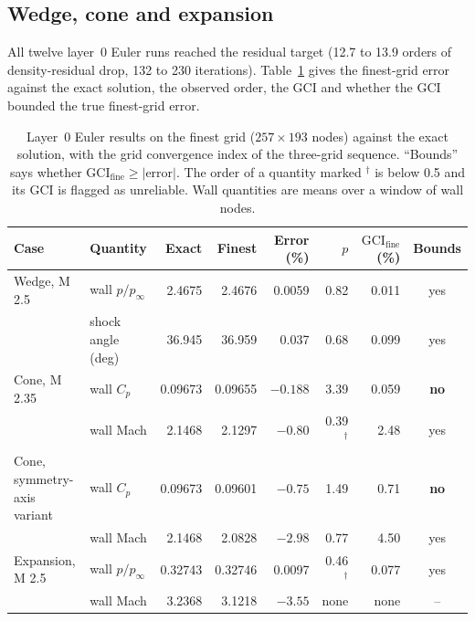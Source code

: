 \documentclass[11pt,a4paper]{article}
\newcommand{\Cp}{C_p}
\newcommand{\pinf}{p_\infty}
\newcommand{\fine}{\mathrm{fine}}
\newcommand{\tick}{yes}
\newcommand{\cross}{\textbf{no}}
\begin{document}
\subsection{Wedge, cone and expansion}
\label{sec:l0results}

All twelve layer~0 Euler runs reached the residual target (12.7 to 13.9 orders of density-residual drop, 132 to
230 iterations).
Table~\ref{tab:l0} gives the finest-grid error against the exact solution, the observed order, the GCI and
whether the GCI bounded the true finest-grid error.

\begin{table}[t]
\centering
\caption{Layer~0 Euler results on the finest grid ($257\times193$ nodes) against the exact solution, with the grid convergence index of the three-grid sequence.
``Bounds'' says whether $\mathrm{GCI}_\fine\ge|\text{error}|$.
The order of a quantity marked $^\dagger$ is below 0.5 and its GCI is flagged as unreliable. Wall quantities are means over a window of wall nodes.}
\label{tab:l0}
\footnotesize
\setlength{\tabcolsep}{4pt}
\begin{tabular}{@{}llrrrrrc@{}}
\toprule
Case & Quantity & Exact & Finest & Error (\%) & $p$ & $\mathrm{GCI}_\fine$ (\%) & Bounds \\
\midrule
Wedge, M 2.5 & wall $p/\pinf$ & 2.4675 & 2.4676 & 0.0059 & 0.82 & 0.011 & \tick \\
 & shock angle (deg) & 36.945 & 36.959 & 0.037 & 0.68 & 0.099 & \tick \\
Cone, M 2.35 & wall $\Cp$ & 0.09673 & 0.09655 & $-0.188$ & 3.39 & 0.059 & \cross \\
 & wall Mach & 2.1468 & 2.1297 & $-0.80$ & 0.39$^\dagger$ & 2.48 & \tick \\
Cone, symmetry-axis variant & wall $\Cp$ & 0.09673 & 0.09601 & $-0.75$ & 1.49 & 0.71 & \cross \\
 & wall Mach & 2.1468 & 2.0828 & $-2.98$ & 0.77 & 4.50 & \tick \\
Expansion, M 2.5 & wall $p/\pinf$ & 0.32743 & 0.32746 & 0.0097 & 0.46$^\dagger$ & 0.077 & \tick \\
 & wall Mach & 3.2368 & 3.1218 & $-3.55$ & none & none & -- \\
\bottomrule
\end{tabular}
\end{table}
\end{document}
